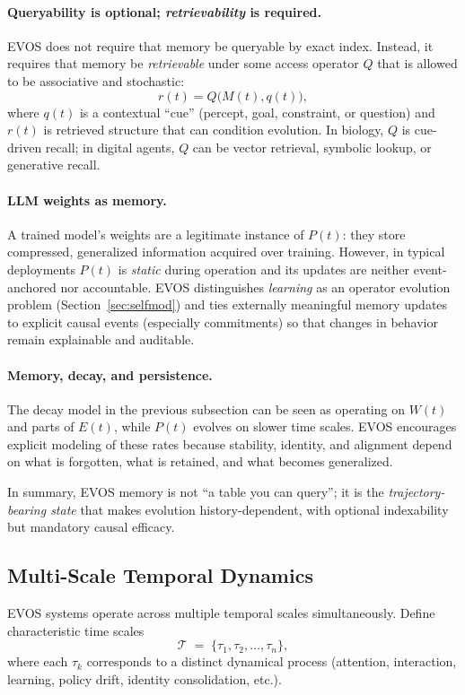 \documentclass[11pt]{article}
\begin{document}
\paragraph{Queryability is optional; \emph{retrievability} is required.}
EVOS does not require that memory be queryable by exact index. Instead, it requires that
memory be \emph{retrievable} under some access operator $Q$ that is allowed to be
associative and stochastic:
\[
r(t) = Q\!\big(M(t), q(t)\big),
\]
where $q(t)$ is a contextual ``cue'' (percept, goal, constraint, or question) and $r(t)$
is retrieved structure that can condition evolution. In biology, $Q$ is cue-driven recall;
in digital agents, $Q$ can be vector retrieval, symbolic lookup, or generative recall.

\paragraph{LLM weights as memory.}
A trained model's weights are a legitimate instance of $P(t)$: they store compressed,
generalized information acquired over training. However, in typical deployments $P(t)$ is
\emph{static} during operation and its updates are neither event-anchored nor
accountable. EVOS distinguishes \emph{learning} as an operator evolution problem (Section~\ref{sec:selfmod})
and ties externally meaningful memory updates to explicit causal events (especially
commitments) so that changes in behavior remain explainable and auditable.

\paragraph{Memory, decay, and persistence.}
The decay model in the previous subsection can be seen as operating on $W(t)$ and parts
of $E(t)$, while $P(t)$ evolves on slower time scales. EVOS encourages explicit modeling
of these rates because stability, identity, and alignment depend on what is forgotten,
what is retained, and what becomes generalized.

In summary, EVOS memory is not ``a table you can query''; it is the \emph{trajectory-bearing
state} that makes evolution history-dependent, with optional indexability but mandatory
causal efficacy.


\subsection{Multi-Scale Temporal Dynamics}

EVOS systems operate across multiple temporal scales simultaneously. Define characteristic
time scales
\[
\mathcal{T} \;=\; \{\tau_1,\tau_2,\dots,\tau_n\},
\]
where each $\tau_k$ corresponds to a distinct dynamical process (attention, interaction,
learning, policy drift, identity consolidation, etc.).
\end{document}
